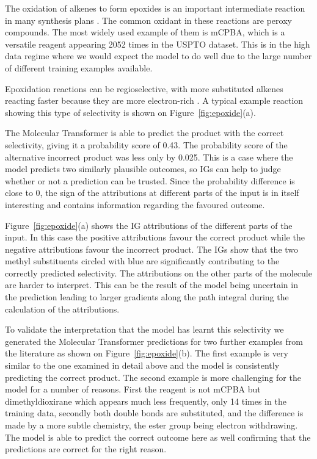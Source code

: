 The oxidation of alkenes to form epoxides is an important intermediate reaction in many synthesis plans \cite{Clayden2012}. The common oxidant in these reactions are peroxy compounds. The most widely used example of them is mCPBA, which is a versatile reagent appearing 2052 times in the USPTO dataset. This is in the high data regime where we would expect the model to do well due to the large number of different training examples available. 

Epoxidation reactions can be regioselective, with more substituted alkenes reacting faster because they are more electron-rich \cite{Clayden2012}. A typical example reaction showing this type of selectivity is shown on Figure~\ref{fig:epoxide}(a). 

The Molecular Transformer is able to predict the product with the correct selectivity, giving it a probability score of 0.43. The probability score of the alternative incorrect product was less only by 0.025. This is a case where the model predicts two similarly plausible outcomes, so IGs can help to judge whether or not a prediction can be trusted. Since the probability difference is close to 0, the sign of the attributions at different parts of the input is in itself interesting and contains information regarding the favoured outcome. 

Figure~\ref{fig:epoxide}(a) shows the IG attributions of the different parts of the input.  In this case the positive attributions favour the correct product while the negative attributions favour the incorrect product. The IGs show that the two methyl substituents circled with blue are significantly contributing to the correctly predicted selectivity. The attributions on the other parts of the molecule are harder to interpret. This can be the result of the model being uncertain in the prediction leading to larger gradients along the path integral during the calculation of the attributions. 

To validate the interpretation that the model has learnt this selectivity we generated the Molecular Transformer predictions for two further examples from the literature as shown on Figure~\ref{fig:epoxide}(b). The first example is very similar to the one examined in detail above and the model is consistently predicting the correct product. The second example is more challenging for the model for a number of reasons. First the reagent is not mCPBA but dimethyldioxirane which appears much less frequently, only 14 times in the training data, secondly both double bonds are substituted, and the difference is made by a more subtle chemistry, the ester group being electron withdrawing. The model is able to predict the correct outcome here as well confirming that the predictions are correct for the right reason. 


